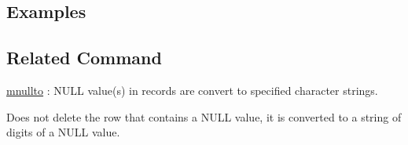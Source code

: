 \subsection*{Examples}


\subsection*{Related Command}
\hyperref[sect:mnullto]{mnullto} : NULL value(s) in records are convert to specified character strings. 

Does not delete the row that contains a NULL value, it is converted to a string of digits of a NULL value.

%
